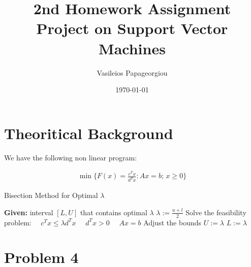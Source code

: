 \documentclass[10pt,a4paper]{article}
\title{2nd Homework Assignment \\ \huge{Project on Support Vector Machines}}
\author{Vasileios Papageorgiou}
\date{\today}
\begin{document}
	\maketitle
	\thispagestyle{fancy}
	
	

\section*{Theoritical Background}

We have the following non linear program:

\begin{equation}\label{eq:3}
	\begin{aligned}
		\min \{ F(x) = \frac{c^T x}{d^T x} : A x = b; \, x \geq 0 \}
	\end{aligned}
\end{equation}



\begin{algorithm}
	\caption{Bisection Method for Optimal $\lambda$}
	\begin{algorithmic}[1]
		\State \textbf{Given:} interval $[L, U]$ that contains optimal $\lambda$
		\Repeat
		\State $\lambda := \frac{u + l}{2}$
		\State Solve the feasibility problem:
		\State $\quad c^T x \leq \lambda d^T x $
		\State $\quad d^T x > 0$
		\State $\quad Ax = b$
		\State Adjust the bounds
		\State $U := \lambda$
		\Else
		\State $L := \lambda$
		\EndIf
	\end{algorithmic}
\end{algorithm}

\section*{Problem 4}
 
\end{document}

